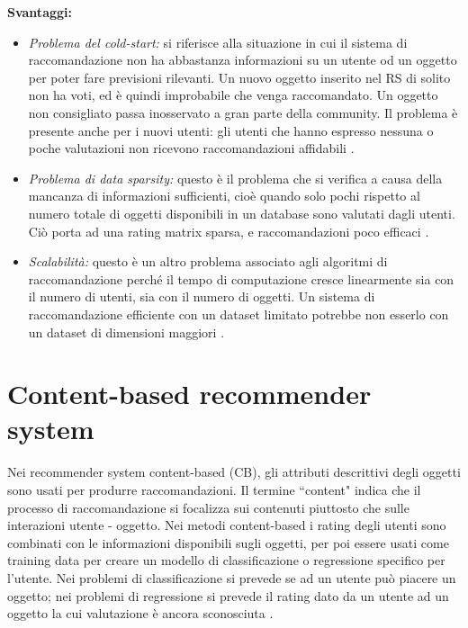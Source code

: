 \noindent \textbf{Svantaggi:}
\begin{itemize}
 \item \textit{Problema del cold-start:} si riferisce alla situazione in cui il sistema di raccomandazione non ha abbastanza informazioni su un utente od un oggetto per poter fare previsioni rilevanti. Un nuovo oggetto inserito nel RS di solito non ha voti, ed è quindi improbabile che venga raccomandato. Un oggetto non consigliato passa inosservato a gran parte della community. Il problema è presente anche per i nuovi utenti: gli utenti che hanno espresso nessuna o poche valutazioni non ricevono raccomandazioni affidabili \cite{cold-start}.   
 
 \item  \textit{Problema di data sparsity:} questo è il problema che si verifica a causa della mancanza di informazioni sufficienti, cioè quando solo pochi rispetto al numero totale di oggetti disponibili in un database sono valutati dagli utenti. Ciò porta ad una rating matrix sparsa, e raccomandazioni poco efficaci \cite{recsys-principle-methods-evaluation}.
 
 \item \textit{Scalabilità:} questo è un altro problema associato agli algoritmi di raccomandazione perché il tempo di computazione cresce linearmente sia con il numero di utenti, sia con il numero di oggetti. Un sistema di raccomandazione efficiente con un dataset limitato potrebbe non esserlo con un dataset di dimensioni maggiori \cite{recsys-principle-methods-evaluation}.
\end{itemize}


\section{Content-based recommender system}
Nei recommender system content-based (CB), gli attributi descrittivi degli oggetti sono usati per produrre raccomandazioni. Il termine ``content" indica che il processo di raccomandazione si focalizza sui contenuti piuttosto che sulle interazioni utente - oggetto. Nei metodi content-based i rating degli utenti sono combinati con le informazioni disponibili sugli oggetti, per poi essere usati come training data per creare un modello di classificazione o regressione  specifico per l'utente. Nei problemi di classificazione si prevede se ad un utente può piacere un oggetto; nei problemi di regressione si prevede il rating dato da un utente ad un oggetto la cui valutazione è ancora sconosciuta \cite{recsys-book}.


